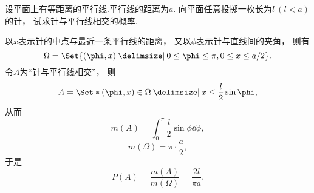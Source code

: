 \begin{example}[布冯投针问题]
设平面上有等距离的平行线.平行线的距离为\(a\).
向平面任意投掷一枚长为\(l\ (l<a)\)的针，
试求针与平行线相交的概率.
\begin{solution}
以\(x\)表示针的中点与最近一条平行线的距离，
又以\(\phi\)表示针与直线间的夹角，
则有\[
	\Omega = \Set{ (\phi,x) \given 0 \leq \phi \leq \pi, 0 \leq x \leq a/2 }.
\]
令\(A\)为“针与平行线相交”，
则\[
	A = \Set*{ (\phi,x)\in\Omega \given x \leq \frac{l}{2} \sin\phi },
\]
从而\[
	m(A) = \int_0^\pi\frac{l}{2} \sin\phi \dd{\phi},
\]\[
	m(\Omega) = \pi \cdot \frac{a}{2},
\]
于是\[
	P(A)
	= \frac{m(A)}{m(\Omega)}
	= \frac{2l}{\pi a}.
\]
\end{solution}
\end{example}
